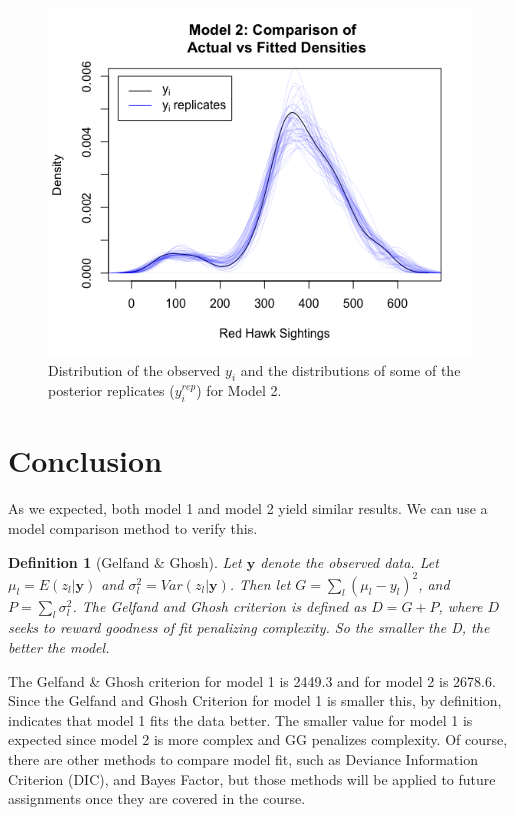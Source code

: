 \documentclass{asaproc}
\newtheorem{defn}{Definition}
\begin{document}
\begin{figure}[h!]
    \centering
    \includegraphics[scale = 0.4]{m2_replicates.png}
    \caption{Distribution of the observed $y_i$ and the distributions of some of the posterior replicates ($y_i^{rep}$) for Model 2.}
    \label{m2replicates}
\end{figure}

\section{Conclusion}
As we expected, both model 1 and model 2 yield similar results. We can use a model comparison method to verify this. 

\begin{defn}[Gelfand \& Ghosh]
Let $\pmb{y}$ denote the observed data. Let $\mu_l = E(z_l|\pmb{y})$ and $\sigma^2_l = Var(z_l|\pmb{y})$. Then let $G = \sum_l (\mu_l - y_l)^2$, and $P = \sum_l \sigma^2_l$. The Gelfand and Ghosh criterion is defined as $D = G + P$, where $D$ seeks to reward goodness of fit penalizing complexity. So the smaller the D, the better the model.
\label{GG}
\end{defn}

The Gelfand \& Ghosh criterion for model 1 is 2449.3 and for model 2 is 2678.6. Since the Gelfand and Ghosh Criterion for model 1 is smaller this, by definition, indicates that model 1 fits the data better. The smaller value for model 1 is expected since model 2 is more complex and GG penalizes complexity. Of course, there are other methods to compare model fit, such as Deviance Information Criterion (DIC), and Bayes Factor, but those methods will be applied to future assignments once they are covered in the course. 
\end{document}
